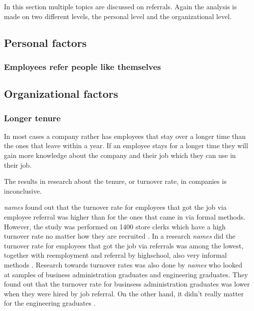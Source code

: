 \documentclass[Main.tex]{subfiles}
\begin{document}
In this section multiple topics are discussed on referrals. Again the analysis is made on two different levels, the personal level and the organizational level. 

\subsection*{Personal factors}

\subsubsection*{Employees refer people like themselves}

\subsection*{Organizational factors}

\subsubsection*{Longer tenure} %
In most cases a company rather has employees that stay over a longer time than the ones that leave within a year. If an employee stays for a longer time they will gain more knowledge about the company and their job which they can use in their job. 

The results in research about the tenure, or turnover rate, in companies is inconclusive.

\emph{names} found out that the turnover rate for employees that got the job via employee referral was higher than for the ones that came in via formal methods. However, the study was performed on 1400 store clerks which have a high turnover rate no matter how they are recruited \cite{second}. In a research \emph{names} did the turnover rate for employees that got the job via referrals was among the lowest, together with reemployment and referral by highschool, also very informal methods \cite{seventh}.
Research towards turnover rates was also done by \emph{names} who looked at samples of business administration graduates and engineering graduates. They found out that the turnover rate for businsess administration graduates was lower when they were hired by job referral. On the other hand, it didn't really matter for the engineering graduates \cite{eleventh}.
\end{document}

